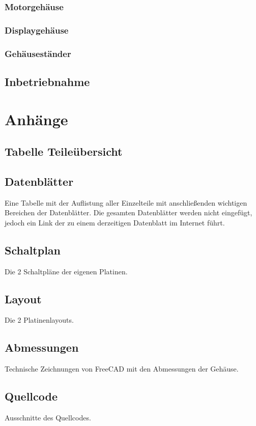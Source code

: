 \documentclass[a4paper, twoside, 10pt]{article}
\begin{document}
			\subsubsection{Motorgehäuse}
			\subsubsection{Displaygehäuse}
			\subsubsection{Gehäuseständer}
		\subsection{Inbetriebnahme}
	\section{Anhänge}
		\subsection{Tabelle Teileübersicht}
		\subsection{Datenblätter}
			Eine Tabelle mit der Auflistung aller Einzelteile mit anschließenden wichtigen Bereichen der Datenblätter.
			Die gesamten Datenblätter werden nicht eingefügt, jedoch ein Link der zu einem derzeitigen Datenblatt im Internet führt.
		\subsection{Schaltplan}
			Die 2 Schaltpläne der eigenen Platinen.
		\subsection{Layout}
			Die 2 Platinenlayouts.
		\subsection{Abmessungen}
			Technische Zeichnungen von FreeCAD mit den Abmessungen der Gehäuse.
		\subsection{Quellcode}
			Ausschnitte des Quellcodes.
	
\end{document}
